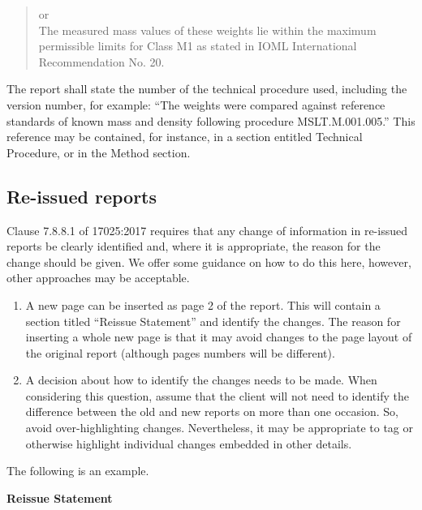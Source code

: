 \begin{quote}
\begin{tabbing}
\begin{minipage}[t]{.7\textwidth}
or\\

The measured mass values of these weights lie within the maximum permissible limits for Class M1 as stated in IOML International Recommendation No. 20. 

\end{minipage}
\end{tabbing}
\end{quote}

The report shall state the number of the technical procedure used, including the version number, for example: ``The weights were compared against reference standards of known mass and density following procedure MSLT.M.001.005.''  This reference may be contained, for instance, in a section entitled Technical Procedure, or in the Method section.

\subsection{Re-issued reports}
 \label{ss:reissued_reports}
Clause 7.8.8.1 of 17025:2017 requires that any change of information in re-issued reports be clearly identified and, where it is appropriate, the reason for the change should be given. We offer some guidance on how to do this here, however, other approaches may be acceptable.
\begin{enumerate}
\item	A new page can be inserted as page 2 of the report. This will contain a section titled ``Reissue Statement'' and identify the changes. The reason for inserting a whole new page is that it may avoid changes to the page layout of the original report (although pages numbers will be different).
\item	A decision about how to identify the changes needs to be made. When considering this question, assume that the client will not need to identify the difference between the old and new reports on more than one occasion. So, avoid over-highlighting changes. Nevertheless, it may be appropriate to tag or otherwise highlight individual changes embedded in other details. 
\end{enumerate}
The following is an example.

\textbf{\large Reissue Statement}\\

